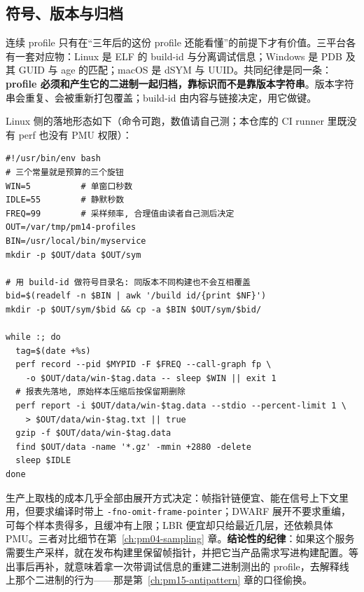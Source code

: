 \documentclass[12pt,a4paper,fontset=fandol]{ctexbook}
\newcommand{\Tp}[1]{\texttt{#1}}
\newcommand{\Bk}{\discretionary{}{}{}}
\begin{document}
\subsection{符号、版本与归档}
\label{sub:pm14-symbols}

连续 profile 只有在``三年后的这份 profile 还能看懂''的前提下才有价值。三平台各有一套对应物：Linux 是 ELF 的 build-id 与分离调试信息；Windows 是 PDB 及其 GUID 与 age 的匹配；macOS 是 dSYM 与 UUID。共同纪律是同一条：\textbf{profile 必须和产生它的二进制一起归档，靠标识而不是靠版本字符串}。版本字符串会重复、会被重新打包覆盖；build-id 由内容与链接决定，用它做键。

Linux 侧的落地形态如下（命令可跑，数值请自己测；本仓库的 CI runner 里既没有 perf 也没有 PMU 权限）：

\begin{lstlisting}[style=shellstyle, caption={线上符号归档与低占空比采样骨架（形态示意，不含任何实测值）}, label={lst:pm14-duty}]
#!/usr/bin/env bash
# 三个常量就是预算的三个旋钮
WIN=5          # 单窗口秒数
IDLE=55        # 静默秒数
FREQ=99        # 采样频率, 合理值由读者自己测后决定
OUT=/var/tmp/pm14-profiles
BIN=/usr/local/bin/myservice
mkdir -p $OUT/data $OUT/sym

# 用 build-id 做符号目录名: 同版本不同构建也不会互相覆盖
bid=$(readelf -n $BIN | awk '/build id/{print $NF}')
mkdir -p $OUT/sym/$bid && cp -a $BIN $OUT/sym/$bid/

while :; do
  tag=$(date +%s)
  perf record --pid $MYPID -F $FREQ --call-graph fp \
    -o $OUT/data/win-$tag.data -- sleep $WIN || exit 1
  # 报表先落地, 原始样本压缩后按保留期删除
  perf report -i $OUT/data/win-$tag.data --stdio --percent-limit 1 \
    > $OUT/data/win-$tag.txt || true
  gzip -f $OUT/data/win-$tag.data
  find $OUT/data -name '*.gz' -mmin +2880 -delete
  sleep $IDLE
done
\end{lstlisting}

\begin{note}[title={帧指针这件事要在发版前决定}]
\label{box:pm14-fp}
生产上取栈的成本几乎全部由展开方式决定：帧指针链便宜、能在信号上下文里用，但要求编译时带上 \Tp{-fno-{\Bk}omit-{\Bk}frame-{\Bk}pointer}；DWARF 展开不要求重编，可每个样本贵得多，且缓冲有上限；LBR 便宜却只给最近几层，还依赖具体 PMU。三者对比细节在第~\ref{ch:pm04-sampling} 章。\textbf{结论性的纪律}：如果这个服务需要生产采样，就在发布构建里保留帧指针，并把它当产品需求写进构建配置。等出事后再补，就意味着拿一次带调试信息的重建二进制测出的 profile，去解释线上那个二进制的行为——那是第~\ref{ch:pm15-antipattern} 章的口径偷换。
\end{note}
\end{document}
